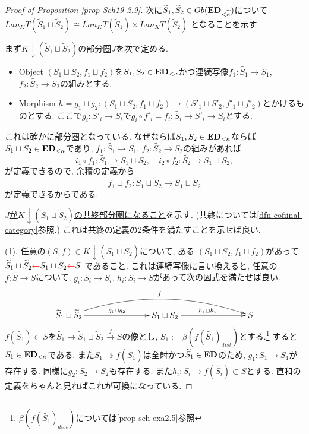 \documentclass[dvipdfmx,a4paper,11pt]{article}
\theoremstyle{definition}
\newcommand{\xr}[1]{\textcolor{red}{#1}}
\begin{document}
\begin{proof}[Proof of Proposition \ref{prop-Sch19-2.9}]
次に$\widetilde{S}_1,  \widetilde{S}_2\in Ob({\bf ED}_{<\widetilde{\kappa}})$について
$Lan_{K}T (\widetilde{S}_1 \sqcup  \widetilde{S}_2) \cong
 Lan_{K}T (\widetilde{S}_1 ) \times  Lan_{K}T ( \widetilde{S}_2)$
となることを示す.

まず$K \downarrow  (\widetilde{S}_1 \sqcup  \widetilde{S}_2)$の部分圏$J$を次で定める.
\begin{itemize}
\item Object $(S_1 \sqcup  S_2, f_1 \sqcup  f_2)$を$S_1, S_2 \in {\bf ED}_{<\kappa}$かつ連続写像$f_1 : \widetilde{S_1} \to S_1$, $f_2 : \widetilde{S_2} \to S_2$の組みとする. 
\item Morphism $h=g_1\sqcup g_2 : (S_1 \sqcup S_2, f_1 \sqcup f_2) \to  (S'_{1} \sqcup S'_2, f'_1 \sqcup f'_2)$とかけるものとする. ここで$g_i : S'_{i} \to S_i$で$g_i \circ f'_i = f_{i} : \widetilde{S_i} \to S'_i \to S_{i}$とする. 
\end{itemize}
これは確かに部分圏となっている. 
なぜならば$S_1, S_2 \in {\bf ED}_{<\kappa}$ならば$S_1 \sqcup  S_2 \in {\bf ED}_{<\kappa}$であり, $f_1 : \widetilde{S_1} \to S_1$, $f_2 : \widetilde{S_2} \to S_2$の組みがあれば
$$
i_1 \circ f_1 : \widetilde{S_1} \to S_1 \sqcup S_2, \quad 
i_2 \circ f_2 : \widetilde{S_2} \to S_1 \sqcup S_2,
$$
が定義できるので, 余積の定義から
$$
f_1 \sqcup f_2  : \widetilde{S}_1 \sqcup \widetilde{S}_2  \to S_1 \sqcup S_2
$$
が定義できるからである. 

\underline{$J$が$K \downarrow  (\widetilde{S}_1 \sqcup  \widetilde{S}_2)$の共終部分圏になること}を示す.
(共終については\ref{dfn-cofiinal-category}参照.) 
これは共終の定義の2条件を満たすことを示せば良い.

(1). 任意の$(S, f) \in K \downarrow  (\widetilde{S}_1 \sqcup  \widetilde{S}_2)$について, ある
$(S_1 \sqcup  S_2, f_1 \sqcup  f_2)$があって
$\widetilde{S}_1 \sqcup  \widetilde{S}_2 \xr{\leftarrow} S_1 \sqcup  S_2  \xr{\leftarrow} S$
であること.
これは連続写像に言い換えると, 任意の$f : \widetilde{S} \to S$について, 
$g_i: \widetilde{S}_i \to S_i$, $h_i: S_i \to S$があって次の図式を満たせば良い.
\begin{equation*}
\label{eq-conti}
\xymatrix@C=78pt@R=20pt{
\widetilde{S}_1 \sqcup  \widetilde{S}_2 \ar@/^20pt/[rr]^{f} 
 \ar@{->}[r]^{g_1 \sqcup  g_2}
&S_1 \sqcup  S_2  \ar@{->}[r]^{h_1 \sqcup  h_2}
& S
\\
}
\end{equation*}
$f(\widetilde{S_1} ) \subset S$を$\widetilde{S_1} \to \widetilde{S}_1 \sqcup  \widetilde{S}_2 \overset{f}{\to} S$の像とし, $S_1 := \beta (f(\widetilde{S_1} )_{dist}) $とする.\footnote{ $\beta (f(\widetilde{S_1} )_{dist})$については\ref{prop-sch-exa2.5}参照}
すると$S_1 \in {\bf ED}_{<\kappa}$である.
また$S_1 \twoheadrightarrow f(\widetilde{S_1} ) $は全射かつ$\widetilde{S}_1 \in {\bf ED}$のため, $g_1 : \widetilde{S_1} \to S_1$が存在する. 
同様に$g_2 : \widetilde{S_2} \to S_2$も存在する.
また$h_i : S_i \to f(\widetilde{S_i} ) \subset S$とする.
直和の定義をちゃんと見ればこれが可換になっている.


\end{proof}
\end{document}
